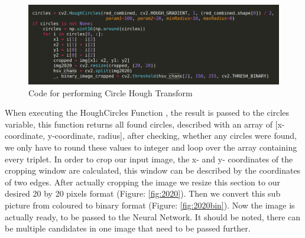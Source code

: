 \begin{figure}[H]
	\minipage{\textwidth}
	\includegraphics[width=\linewidth]{images/detectioncode.png}
	\caption{Code for performing Circle Hough Transform}\label{fig:detection_code}
	\endminipage\hfill
\end{figure}
When executing the HoughCircles Function \cite{houghcircles}, the result is passed to the circles variable, this function returns all found circles, described with an array of [x-coordinate, y-coordinate, radius],  after checking, whether any circles were found, we only have to round these values to integer and loop over the array containing every triplet. \newline
In order to crop our input image, the x- and y- coordinates of the cropping window are calculated, this window can be described by the coordinates of two edges. After actually cropping the image we resize this section to our desired 20 by 20 pixels format (Figure: \ref{fig:2020}). Then we convert this sub picture from coloured to binary format (Figure: \ref{fig:2020bin}). Now the image is actually ready, to be passed to the Neural Network. It should be noted, there can be multiple candidates in one image that need to be passed further.   

